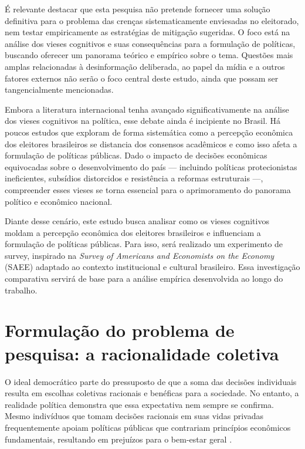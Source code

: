 É relevante destacar que esta pesquisa não pretende fornecer uma solução definitiva para o problema das crenças sistematicamente enviesadas no eleitorado, nem testar empiricamente as estratégias de mitigação sugeridas. O foco está na análise dos vieses cognitivos e suas consequências para a formulação de políticas, buscando oferecer um panorama teórico e empírico sobre o tema. Questões mais amplas relacionadas à desinformação deliberada, ao papel da mídia e a outros fatores externos não serão o foco central deste estudo, ainda que possam ser tangencialmente mencionadas.

Embora a literatura internacional tenha avançado significativamente na análise dos vieses cognitivos na política, esse debate ainda é incipiente no Brasil. Há poucos estudos que exploram de forma sistemática como a percepção econômica dos eleitores brasileiros se distancia dos consensos acadêmicos e como isso afeta a formulação de políticas públicas. Dado o impacto de decisões econômicas equivocadas sobre o desenvolvimento do país — incluindo políticas protecionistas ineficientes, subsídios distorcidos e resistência a reformas estruturais —, compreender esses vieses se torna essencial para o aprimoramento do panorama político e econômico nacional.

Diante desse cenário, este estudo busca analisar como os vieses cognitivos moldam a percepção econômica dos eleitores brasileiros e influenciam a formulação de políticas públicas. Para isso, será realizado um experimento de survey, inspirado na \textit{Survey of Americans and Economists on the Economy} (SAEE) adaptado ao contexto institucional e cultural brasileiro. Essa investigação comparativa servirá de base para a análise empírica desenvolvida ao longo do trabalho.

\section{Formulação do problema de pesquisa: a racionalidade coletiva} %


O ideal democrático parte do pressuposto de que a soma das decisões individuais resulta em escolhas coletivas racionais e benéficas para a sociedade. No entanto, a realidade política demonstra que essa expectativa nem sempre se confirma. Mesmo indivíduos que tomam decisões racionais em suas vidas privadas frequentemente apoiam políticas públicas que contrariam princípios econômicos fundamentais, resultando em prejuízos para o bem-estar geral \cite{downs1957economic,The_Myth_of_the_Rational_Voter}.  

